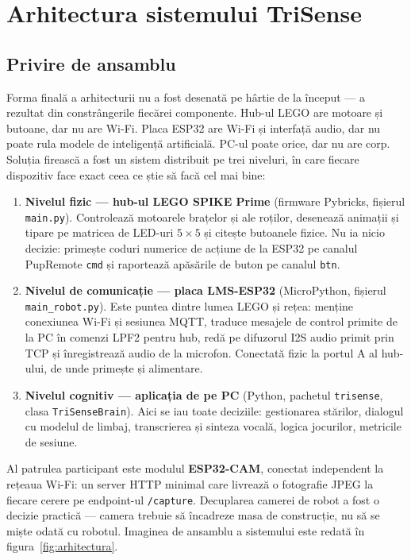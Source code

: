 \chapter{Arhitectura sistemului TriSense}
\label{cap:arhitectura}

\section{Privire de ansamblu}

Forma finală a arhitecturii nu a fost desenată pe hârtie de la început — a rezultat din constrângerile fiecărei componente. Hub-ul LEGO are motoare și butoane, dar nu are Wi-Fi. Placa ESP32 are Wi-Fi și interfață audio, dar nu poate rula modele de inteligență artificială. PC-ul poate orice, dar nu are corp. Soluția firească a fost un sistem distribuit pe trei niveluri, în care fiecare dispozitiv face exact ceea ce știe să facă cel mai bine:

\begin{enumerate}
    \item \textbf{Nivelul fizic — hub-ul LEGO SPIKE Prime} (firmware Pybricks, fișierul \texttt{main.py}). Controlează motoarele brațelor și ale roților, desenează animații și tipare pe matricea de LED-uri $5\times5$ și citește butoanele fizice. Nu ia nicio decizie: primește coduri numerice de acțiune de la ESP32 pe canalul PupRemote \texttt{cmd} și raportează apăsările de buton pe canalul \texttt{btn}.
    \item \textbf{Nivelul de comunicație — placa LMS-ESP32} (MicroPython, fișierul \texttt{main\_robot.py}). Este puntea dintre lumea LEGO și rețea: menține conexiunea Wi-Fi și sesiunea MQTT, traduce mesajele de control primite de la PC în comenzi LPF2 pentru hub, redă pe difuzorul I2S audio primit prin TCP și înregistrează audio de la microfon. Conectată fizic la portul A al hub-ului, de unde primește și alimentare.
    \item \textbf{Nivelul cognitiv — aplicația de pe PC} (Python, pachetul \texttt{trisense}, clasa \texttt{TriSenseBrain}). Aici se iau toate deciziile: gestionarea stărilor, dialogul cu modelul de limbaj, transcrierea și sinteza vocală, logica jocurilor, metricile de sesiune.
\end{enumerate}

Al patrulea participant este modulul \textbf{ESP32-CAM}, conectat independent la rețeaua Wi-Fi: un server HTTP minimal care livrează o fotografie JPEG la fiecare cerere pe endpoint-ul \texttt{/capture}. Decuplarea camerei de robot a fost o decizie practică — camera trebuie să încadreze masa de construcție, nu să se miște odată cu robotul. Imaginea de ansamblu a sistemului este redată în figura~\ref{fig:arhitectura}.

